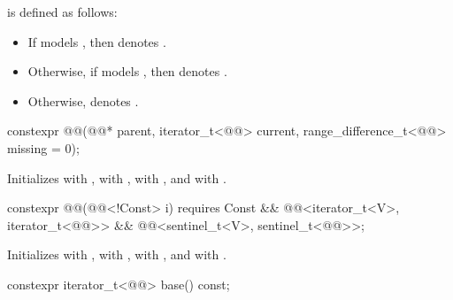 \pnum
{} is defined as follows:
\begin{itemize}
\item
If  models ,
then  denotes .
\item
Otherwise, if  models ,
then  denotes .
\item
Otherwise,  denotes .
\end{itemize}

%
\begin{itemdecl}
constexpr @@(@@* parent, iterator_t<@@> current,
                   range_difference_t<@@> missing = 0);
\end{itemdecl}

\begin{itemdescr}
\pnum
\effects
Initializes  with ,
 with ,
 with , and
 with .
\end{itemdescr}

%
\begin{itemdecl}
constexpr @@(@@<!Const> i)
  requires Const && @@<iterator_t<V>, iterator_t<@@>>
                 && @@<sentinel_t<V>, sentinel_t<@@>>;
\end{itemdecl}

\begin{itemdescr}
\pnum
\effects
Initializes  with ,
 with ,
 with , and
 with .
\end{itemdescr}

%
\begin{itemdecl}
constexpr iterator_t<@@> base() const;
\end{itemdecl}

